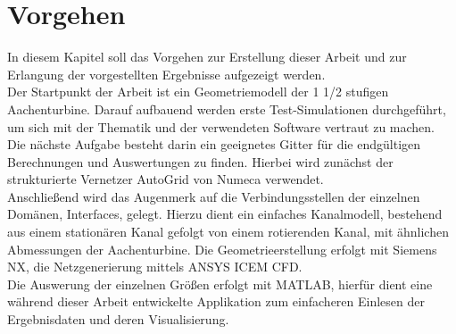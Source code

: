 \chapter{Vorgehen}
In diesem Kapitel soll das Vorgehen zur Erstellung dieser Arbeit und zur Erlangung der vorgestellten Ergebnisse aufgezeigt werden. \\
Der Startpunkt der Arbeit ist ein Geometriemodell der 1 1/2 stufigen Aachenturbine. Darauf aufbauend werden erste Test-Simulationen durchgeführt, um sich mit der Thematik und der verwendeten Software vertraut zu machen. Die nächste Aufgabe besteht darin ein geeignetes Gitter für die endgültigen Berechnungen und Auswertungen zu finden. Hierbei wird zunächst der strukturierte Vernetzer AutoGrid von Numeca verwendet.\\
Anschließend wird das Augenmerk auf die Verbindungsstellen der einzelnen Domänen, Interfaces, gelegt. Hierzu dient ein einfaches Kanalmodell, bestehend aus einem stationären Kanal gefolgt von einem rotierenden Kanal, mit ähnlichen Abmessungen der Aachenturbine. Die Geometrieerstellung erfolgt mit Siemens NX, die Netzgenerierung mittels ANSYS ICEM CFD.\\ 
Die Auswerung der einzelnen Größen erfolgt mit MATLAB, hierfür dient eine während dieser Arbeit entwickelte Applikation zum einfacheren Einlesen der Ergebnisdaten und deren Visualisierung.    

